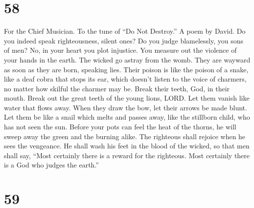 \hypertarget{section-56}{%
\section{58}\label{section-56}}

For the Chief Musician. To the tune of ``Do Not Destroy.'' A poem by
David.  Do you indeed speak righteousness, silent ones? Do
you judge blamelessly, you sons of men?  No, in your heart
you plot injustice. You measure out the violence of your hands in the
earth.  The wicked go astray from the womb. They are wayward
as soon as they are born, speaking lies.  Their poison is
like the poison of a snake, like a deaf cobra that stops its ear,
 which doesn't listen to the voice of charmers, no matter
how skilful the charmer may be.  Break their teeth, God, in
their mouth. Break out the great teeth of the young lions, LORD.
 Let them vanish like water that flows away. When they draw
the bow, let their arrows be made blunt.  Let them be like a
snail which melts and passes away, like the stillborn child, who has not
seen the sun.  Before your pots can feel the heat of the
thorns, he will sweep away the green and the burning alike.
 The righteous shall rejoice when he sees the vengeance. He
shall wash his feet in the blood of the wicked,  so that
men shall say, ``Most certainly there is a reward for the righteous.
Most certainly there is a God who judges the earth.''

\hypertarget{section-57}{%
\section{59}\label{section-57}}

